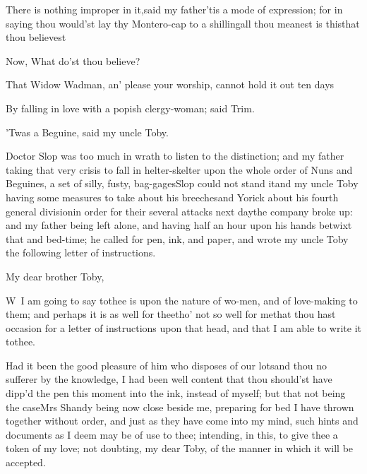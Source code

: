 \documentclass{article}
\begin{document}
\tsk There is nothing improper in it,\break said my
father\tsk ’tis a mode of expression; for in saying thou
would’st lay thy Montero-cap to a shilling\tsk all
thou meanest is this\tsk that thou believest\tsh

\tsh Now, What do’st thou believe?

That Widow Wadman, an’ please your worship, cannot
hold it out ten days\tsh

\noindent
{}

By falling in love with a popish clergy-woman; said
Trim.

’Twas a Beguine, said my uncle Toby.

\newpage
Doctor Slop was too much in wrath to listen to the
distinction; and my father taking that very crisis to fall in
helter-skelter upon the whole order of Nuns and Beguines, a
set of silly, fusty, bag-\break gages\tsh Slop could not stand
it\tsh\break and my uncle Toby having some measures to take
about his breeches\tsk and Yorick about his fourth general
division\break\tsk in order for their several attacks next
day\tsk the company broke up: and my father being left alone, and
having half an hour upon his hands betwixt that and bed-time; he
called for pen, ink, and paper, and wrote my uncle Toby the
following letter of instructions.

\newpage
\setlength{\baselineskip}{13.36pt} %
My dear brother Toby,

\vskip -6pt

\lettrine{W}{\,} I am going to say to\break thee is
upon the nature of wo-\break men, and of love-making to them; and perhaps
it is as well for thee\tsk tho’ not so well for
me\tsk that thou hast occasion for a letter of instructions upon
that head, and that I am able to write it to\break thee.

Had it been the good pleasure of him who disposes of our
lots\tsk and thou no sufferer by the knowledge, I had been well content that thou should’st have
dipp’d the pen this moment into the ink, instead of myself;
but that not being the case\tsh\tsk Mrs Shandy
being now close beside me, preparing for bed\tsh\pb 
I have thrown together without order, and just as they have come into my mind, such
hints and documents as I deem may be of use to thee; intending, in this, to give
thee a token of my love; not doubting, my dear Toby, of the manner in which it will
be accepted.
\end{document}
